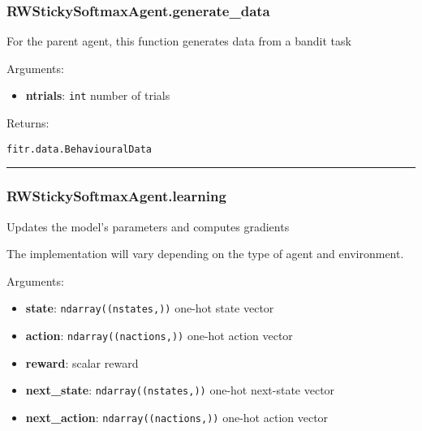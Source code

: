 \subsubsection{RWStickySoftmaxAgent.generate\_data}\label{rwstickysoftmaxagent.generate_data}

\begin{Shaded}
\begin{Highlighting}[]
\end{Highlighting}
\end{Shaded}

For the parent agent, this function generates data from a bandit task

Arguments:

\begin{itemize}
\tightlist
\item
  \textbf{ntrials}: \texttt{int} number of trials
\end{itemize}

Returns:

\texttt{fitr.data.BehaviouralData}

\begin{center}\rule{0.5\linewidth}{\linethickness}\end{center}

\subsubsection{RWStickySoftmaxAgent.learning}\label{rwstickysoftmaxagent.learning}

\begin{Shaded}
\begin{Highlighting}[]
\end{Highlighting}
\end{Shaded}

Updates the model's parameters and computes gradients

The implementation will vary depending on the type of agent and
environment.

Arguments:

\begin{itemize}
\tightlist
\item
  \textbf{state}: \texttt{ndarray((nstates,))} one-hot state vector
\item
  \textbf{action}: \texttt{ndarray((nactions,))} one-hot action vector
\item
  \textbf{reward}: scalar reward
\item
  \textbf{next\_state}: \texttt{ndarray((nstates,))} one-hot next-state
  vector
\item
  \textbf{next\_action}: \texttt{ndarray((nactions,))} one-hot action
  vector
\end{itemize}

